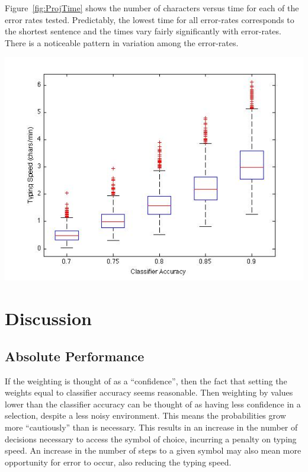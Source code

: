 \documentclass[12pt,titlepage]{article}
\begin{document}
Figure~\ref{fig:ProjTime} shows the number of characters versus time for each of the error rates tested. 
Predictably, the lowest time for all error-rates corresponds to the shortest sentence and the 
times vary fairly significantly with error-rates.  There is a noticeable pattern in variation among 
the error-rates.

\begin{center}
	\includegraphics[scale=0.40]{ProjTypeSpeedComp.jpg}
	\label{fig:TypeSpeed}
\end{center}

\section{Discussion}

\subsection{Absolute Performance}

If the weighting is thought of as a ``confidence'', then the fact that setting the weights equal to 
classifier accuracy seems reasonable.  Then weighting by values lower than the classifier 
accuracy can be thought of as having less confidence in a selection, despite a less noisy 
environment.  This means the probabilities grow more ``cautiously'' than is necessary.  This 
results in an increase in the number of decisions necessary to access the symbol of choice, 
incurring a penalty on typing speed.  An increase in the number of steps to a given symbol may 
also mean more opportunity for error to occur, also reducing the typing speed.
\end{document}
